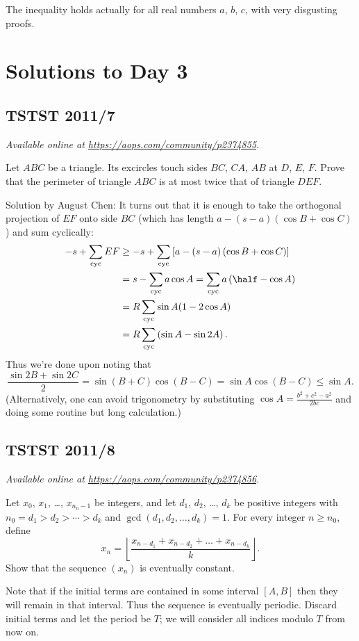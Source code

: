 \documentclass[11pt]{scrartcl}
\begin{document}
\begin{remark*}
  The inequality holds actually for
  all real numbers $a$, $b$, $c$,
  with very disgusting proofs.
\end{remark*}
\pagebreak

\section{Solutions to Day 3}
\subsection{TSTST 2011/7}
\textsl{Available online at \url{https://aops.com/community/p2374855}.}
\begin{mdframed}[style=mdpurplebox,frametitle={Problem statement}]
Let $ABC$ be a triangle.
Its excircles touch sides $BC$, $CA$, $AB$ at $D$, $E$, $F$.
Prove that the perimeter of triangle $ABC$ is
at most twice that of triangle $DEF$.
\end{mdframed}
Solution by August Chen:
It turns out that it is enough to take the
orthogonal projection of $EF$ onto side $BC$
(which has length $a-(s-a)(\cos B + \cos C)$)
and sum cyclically:
\begin{align*}
  -s + \sum_{\text{cyc}} EF &\ge
  -s +
  \sum_{\text{cyc}}
  \left[ a - (s-a)\left( \cos B + \cos C \right) \right] \\
  &= s - \sum_{\text{cyc}} a \cos A
    = \sum_{\text{cyc}} a \left( \half - \cos A \right) \\
  &= R \sum_{\text{cyc}}
  \sin A (1 - 2 \cos A) \\
  &= R \sum_{\text{cyc}} \left( \sin A - \sin2A \right).
\end{align*}
Thus we're done upon noting that
\[ \frac{\sin2B + \sin2C}{2} = \sin(B+C) \cos(B-C)
  = \sin A \cos(B-C) \le \sin A. \]
(Alternatively, one can avoid trigonometry by substituting
$\cos A = \frac{b^2+c^2-a^2}{2bc}$
and doing some routine but long calculation.)
\pagebreak

\subsection{TSTST 2011/8}
\textsl{Available online at \url{https://aops.com/community/p2374856}.}
\begin{mdframed}[style=mdpurplebox,frametitle={Problem statement}]
Let $x_0$, $x_1$, \dots, $x_{n_0-1}$ be integers,
and let $d_1$, $d_2$, \dots, $d_k$ be positive integers
with $n_0 = d_1 > d_2 > \dotsb > d_k$ and
$\gcd(d_1, d_2, \dots, d_k) = 1$.
For every integer $n \geq n_0$, define
\[ x_n = \left\lfloor \frac{x_{n-d_1} + x_{n-d_2}
  + \dots + x_{n-d_k}}{k} \right\rfloor. \]
Show that the sequence $(x_n)$ is eventually constant.
\end{mdframed}
Note that if the initial terms are contained
in some interval $[A,B]$ then they will remain in that interval.
Thus the sequence is eventually periodic.
Discard initial terms and let the period be $T$;
we will consider all indices modulo $T$ from now on.
\end{document}

